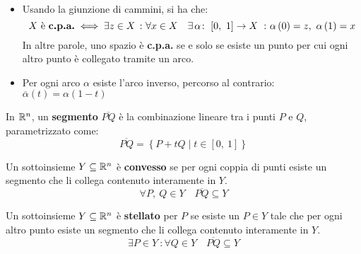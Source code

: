 \begin{observe}~{}\label{giunzionecpa}
	\begin{itemize}
		\item Usando la giunzione di cammini, si ha che:
		\begin{equation*}
			X\text{ è \textbf{c.p.a.}}\iff \exists z\in X\ \colon \forall x\in X\quad
			\exists \funz{\alpha}{\left[0,\ 1\right]}{X}\ \colon \alpha\left(0\right)=z,\ \alpha\left(1\right)=x
		\end{equation*}
		In altre parole, uno spazio è \textbf{c.p.a.} se e solo se esiste un punto per cui ogni altro punto è collegato tramite un arco.
		\item Per ogni arco $\alpha$ esiste l'arco inverso, percorso al contrario: $\overline{\alpha}\left(t\right)=\alpha\left(1-t\right)$
	\end{itemize}
\end{observe}
\begin{define}
In $\mathbb{R}^n$, un \textbf{segmento} $\overline{PQ}$ è la combinazione lineare tra i punti $P$ e $Q$, parametrizzato come:
\begin{equation}
\overline{PQ}=\left\{P+tQ\mid t\in\left[0,\ 1\right]\right\}
\end{equation}
\end{define}
\begin{define}
	Un sottoinsieme $Y\subseteq\mathbb{R}^n$ è \textbf{convesso} se per ogni coppia di punti esiste un segmento che li collega contenuto interamente in $Y$.
	\begin{equation}
		\forall P,\ Q\in Y\quad \overline{PQ}\subseteq Y
	\end{equation}
\end{define}
\begin{define}
	Un sottoinsieme $Y\subseteq\mathbb{R}^n$ è \textbf{stellato} per $P$ se esiste un $P\in Y$ tale che per ogni altro punto esiste un segmento che li collega contenuto interamente in $Y$.
	\begin{equation}
		\exists P \in Y\ \colon \forall Q\in Y\quad \overline{PQ}\subseteq Y
	\end{equation}
\end{define}
